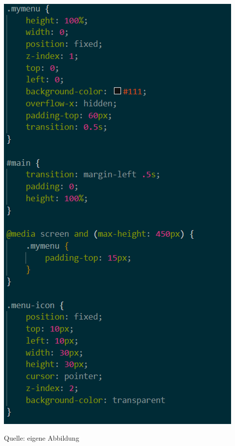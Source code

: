 \documentclass[ngerman,12pt,a4paper]{article}
\begin{document}
	\begin{center}
		\begin{minipage}[t]{0.6\textwidth}
			\includegraphics[scale=0.7]{Pictures/sensordaten-css}
			\label{fig:sensordaten-css}
			\vspace{-10pt}
			\begin{center}
				\par\small Quelle: eigene Abbildung 
			\end{center}
		\end{minipage} \\[0.75cm]
	\end{center}
\end{document}
